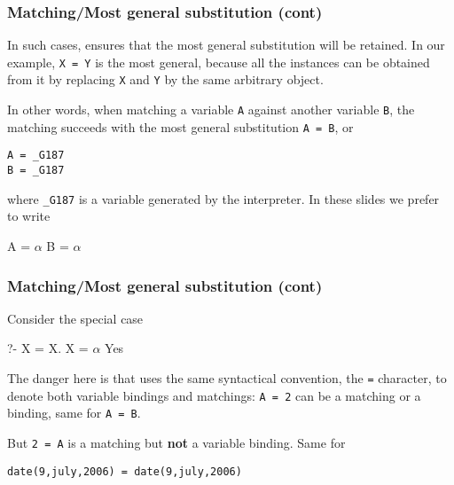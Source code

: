 %
\begin{frame}[containsverbatim]
\frametitle{Matching/Most general substitution (cont)}

In such cases, \Prolog ensures that the most general substitution will
be retained. In our example, \texttt{X = Y} is the most general,
because all the instances can be obtained from it by replacing
\texttt{X} and \texttt{Y} by the same arbitrary object.

\bigskip

In other words, when matching a variable \texttt{A} against another
variable \texttt{B}, the matching succeeds with the most general
substitution \texttt{A = B}, or
{\small
\begin{verbatim}
A = _G187
B = _G187
\end{verbatim}
}
where \texttt{\_G187} is a variable generated by the interpreter. In
these slides we prefer to write
{\small
\begin{semiverbatim}
A = \(\alpha\)
B = \(\alpha\)
\end{semiverbatim}
}

\end{frame}

%
\begin{frame}[containsverbatim]
\frametitle{Matching/Most general substitution (cont)}

Consider the special case
{\small
\begin{semiverbatim}
?- X = X.
X = \(\alpha\)
Yes
\end{semiverbatim}
}
The danger here is that \Prolog uses the same syntactical convention,
the \texttt{=} character, to denote both variable bindings and
matchings: \texttt{A = 2} can be a matching or a binding, same for
\texttt{A = B}. 

\bigskip

But \texttt{2 = A} is a matching but \textbf{not} a variable
binding. Same for 
{\small
\begin{verbatim}
date(9,july,2006) = date(9,july,2006)
\end{verbatim}
}

\end{frame}

